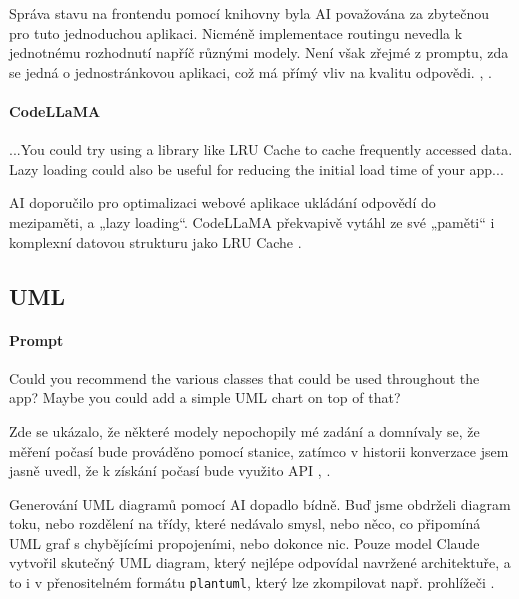 \documentclass[FM,DP]{tulthesis}
\begin{document}
		Správa stavu na frontendu pomocí knihovny byla AI považována za zbytečnou pro tuto jednoduchou aplikaci. Nicméně implementace routingu nevedla k jednotnému rozhodnutí napříč různými modely. Není však zřejmé z promptu, zda se jedná o jednostránkovou aplikaci, což má přímý vliv na kvalitu odpovědi. \cite{claude_navrh}, \cite{chatgpt_navrh}.
		
		\vspace{0.6em}
		\begin{tcolorbox}[colback=white,colframe=black]
			\paragraph{CodeLLaMA}
			...You could try using a library like LRU Cache to cache frequently accessed data. Lazy loading could also be useful for reducing the initial load time of your app... \cite{codellama_navrh}
		\end{tcolorbox}
		\vspace{0.6em}
		
		AI doporučilo pro optimalizaci webové aplikace ukládání odpovědí do mezipaměti, a „lazy loading“. CodeLLaMA překvapivě vytáhl ze své „paměti“ i komplexní datovou strukturu jako LRU Cache \cite{gfg:LRU} \cite{codellama_navrh}.
		
		\subsection{UML}
		
		\vspace{0.6em}
		\begin{tcolorbox}[colback=white,colframe=black]
			\paragraph{Prompt}
			Could you recommend the various classes that could be used throughout the app? Maybe you could add a simple UML chart on top of that?
		\end{tcolorbox}
		\vspace{0.6em}
		
		Zde se ukázalo, že některé modely nepochopily mé zadání a domnívaly se, že měření počasí bude prováděno pomocí stanice, zatímco v historii konverzace jsem jasně uvedl, že k získání počasí bude využito API \cite{bard_navrh}, \cite{falcon_navrh}.
		
		Generování UML diagramů pomocí AI dopadlo bídně. Buď jsme obdrželi diagram toku, nebo rozdělení na třídy, které nedávalo smysl, nebo něco, co připomíná UML graf s chybějícími propojeními, nebo dokonce nic. Pouze model Claude vytvořil skutečný UML diagram, který nejlépe odpovídal navržené architektuře, a to i v přenositelném formátu \verb|plantuml|, který lze zkompilovat např. prohlížeči \cite{claude_navrh} \cite{codellama_navrh} \cite{wikipedia:uml}.
		
\end{document}

